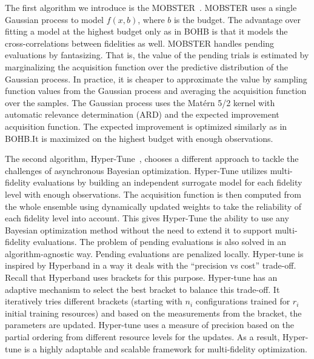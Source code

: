 The first algorithm we introduce is the MOBSTER~\cite{klein2020model}. MOBSTER uses a single Gaussian process to model $f(x,b)$, where $b$ is the budget. The advantage over fitting a model at the highest budget only as in BOHB is that it models the cross-correlations between fidelities as well. MOBSTER handles pending evaluations by fantasizing. That is, the value of the pending trials is estimated by marginalizing the acquisition function over the predictive distribution of the Gaussian process. In practice, it is cheaper to approximate the value by sampling function values from the Gaussian process and averaging the acquisition function over the samples. The Gaussian process uses the Matérn 5/2 kernel with automatic relevance determination (ARD) and the expected improvement acquisition function. The expected improvement is optimized similarly as in BOHB.\@ It is maximized on the highest budget with enough observations.

The second algorithm, Hyper-Tune~\cite{li2022hyper}, chooses a different approach to tackle the challenges of asynchronous Bayesian optimization. Hyper-Tune utilizes multi-fidelity evaluations by building an independent surrogate model for each fidelity level with enough observations. The acquisition function is then computed from the whole ensemble using dynamically updated weights to take the reliability of each fidelity level into account. This gives Hyper-Tune the ability to use any Bayesian optimization method without the need to extend it to support multi-fidelity evaluations. The problem of pending evaluations is also solved in an algorithm-agnostic way. Pending evaluations are penalized locally. Hyper-tune is inspired by Hyperband in a way it deals with the ``precision vs cost'' trade-off. Recall that Hyperband uses brackets for this purpose. Hyper-tune has an adaptive mechanism to select the best bracket to balance this trade-off. It iteratively tries different brackets (starting with $n_i$ configurations trained for $r_i$ initial training resources) and based on the measurements from the bracket, the parameters are updated. Hyper-tune uses a measure of precision based on the partial ordering from different resource levels for the updates. As a result, Hyper-tune is a highly adaptable and scalable framework for multi-fidelity optimization.


